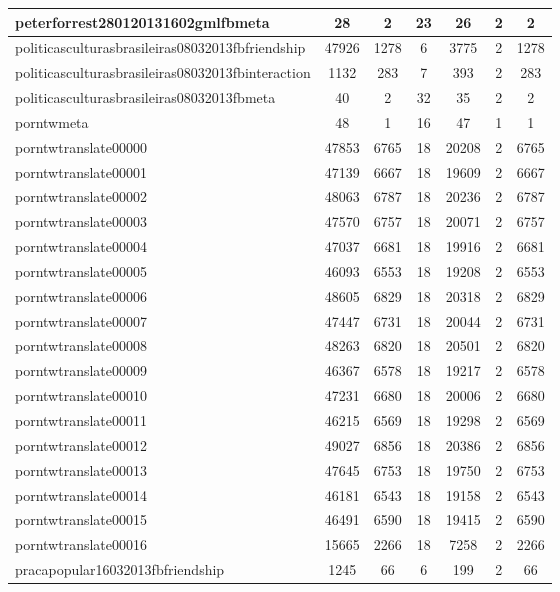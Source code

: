 \begin{table*}[h!]
\begin{center}
\begin{tabular}{| l | c | c | c | c | c | c |}
peterforrest280120131602gmlfbmeta & 28  & 2  & 23  & 26  & 2  & 2 \\\hline
politicasculturasbrasileiras08032013fbfriendship & 47926  & 1278  & 6  & 3775  & 2  & 1278 \\\hline
politicasculturasbrasileiras08032013fbinteraction & 1132  & 283  & 7  & 393  & 2  & 283 \\\hline
politicasculturasbrasileiras08032013fbmeta & 40  & 2  & 32  & 35  & 2  & 2 \\\hline
porntwmeta & 48  & 1  & 16  & 47  & 1  & 1 \\\hline
porntwtranslate00000 & 47853  & 6765  & 18  & 20208  & 2  & 6765 \\\hline
porntwtranslate00001 & 47139  & 6667  & 18  & 19609  & 2  & 6667 \\\hline
porntwtranslate00002 & 48063  & 6787  & 18  & 20236  & 2  & 6787 \\\hline
porntwtranslate00003 & 47570  & 6757  & 18  & 20071  & 2  & 6757 \\\hline
porntwtranslate00004 & 47037  & 6681  & 18  & 19916  & 2  & 6681 \\\hline
porntwtranslate00005 & 46093  & 6553  & 18  & 19208  & 2  & 6553 \\\hline
porntwtranslate00006 & 48605  & 6829  & 18  & 20318  & 2  & 6829 \\\hline
porntwtranslate00007 & 47447  & 6731  & 18  & 20044  & 2  & 6731 \\\hline
porntwtranslate00008 & 48263  & 6820  & 18  & 20501  & 2  & 6820 \\\hline
porntwtranslate00009 & 46367  & 6578  & 18  & 19217  & 2  & 6578 \\\hline
porntwtranslate00010 & 47231  & 6680  & 18  & 20006  & 2  & 6680 \\\hline
porntwtranslate00011 & 46215  & 6569  & 18  & 19298  & 2  & 6569 \\\hline
porntwtranslate00012 & 49027  & 6856  & 18  & 20386  & 2  & 6856 \\\hline
porntwtranslate00013 & 47645  & 6753  & 18  & 19750  & 2  & 6753 \\\hline
porntwtranslate00014 & 46181  & 6543  & 18  & 19158  & 2  & 6543 \\\hline
porntwtranslate00015 & 46491  & 6590  & 18  & 19415  & 2  & 6590 \\\hline
porntwtranslate00016 & 15665  & 2266  & 18  & 7258  & 2  & 2266 \\\hline
pracapopular16032013fbfriendship & 1245  & 66  & 6  & 199  & 2  & 66 \\\hline

\end{tabular}
\end{center}
\end{table*}

